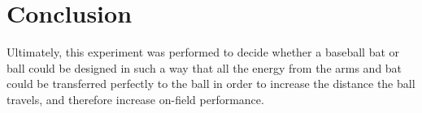 \documentclass[%
 aip,
 amsmath,amssymb,
 reprint,%
 floatfix,%
]{revtex4-1}
\begin{document}
\section{\label{sec:level6}Conclusion}

Ultimately, this experiment was performed to decide whether a baseball bat or ball could be designed in such a way that all the energy from the arms and bat could be transferred perfectly to the ball in order to increase the distance the ball travels, and therefore increase on-field performance.

\nocite{*}
\end{document}
